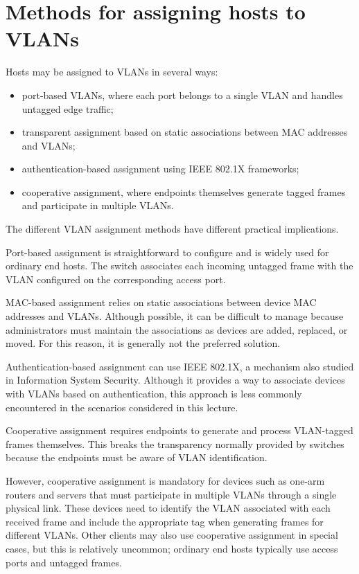 \documentclass[11pt,a4paper,openany]{report}
\begin{document}
\section{Methods for assigning hosts to VLANs}

Hosts may be assigned to VLANs in several ways:

\begin{itemize}
	\item port-based VLANs, where each port belongs to a single VLAN and handles untagged edge traffic;
	\item transparent assignment based on static associations between MAC addresses and VLANs;
	\item authentication-based assignment using IEEE 802.1X frameworks;
	\item cooperative assignment, where endpoints themselves generate tagged frames and participate in multiple VLANs.
\end{itemize}

The different VLAN assignment methods have different practical implications.

Port-based assignment is straightforward to configure and is widely used for ordinary end hosts. The switch associates each incoming untagged frame with the VLAN configured on the corresponding access port.

MAC-based assignment relies on static associations between device MAC addresses and VLANs. Although possible, it can be difficult to manage because administrators must maintain the associations as devices are added, replaced, or moved. For this reason, it is generally not the preferred solution.

Authentication-based assignment can use IEEE 802.1X, a mechanism also studied in Information System Security. Although it provides a way to associate devices with VLANs based on authentication, this approach is less commonly encountered in the scenarios considered in this lecture.

Cooperative assignment requires endpoints to generate and process VLAN-tagged frames themselves. This breaks the transparency normally provided by switches because the endpoints must be aware of VLAN identification.

However, cooperative assignment is mandatory for devices such as one-arm routers and servers that must participate in multiple VLANs through a single physical link. These devices need to identify the VLAN associated with each received frame and include the appropriate tag when generating frames for different VLANs. Other clients may also use cooperative assignment in special cases, but this is relatively uncommon; ordinary end hosts typically use access ports and untagged frames.
\end{document}
